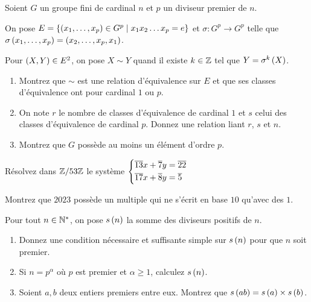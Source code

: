 \begin{exoss}
Soient \(G\) un groupe fini de cardinal \(n\) et \(p\) un diviseur premier de \(n\).

On pose \(E=\left\lbrace\left(x_1,\dots,x_p\right)\in G^p\;\middle|\; x_1x_2\dots x_p=e\right\rbrace\) et \(\sigma:G^p\to G^p\) telle que \(\sigma\left(x_1,\dots,x_p\right)=\left(x_2,\dots,x_p,x_1\right)\).

Pour \(\left(X,Y\right)\in E^2\), on pose \(X\sim Y\) quand il existe \(k\in\mathbb{Z}\) tel que \(Y=\sigma^k\left(X\right)\).

\begin{enumerate}
    \item Montrez que \(\sim\) est une relation d'équivalence sur \(E\) et que ses classes d'équivalence ont pour cardinal \(1\) ou \(p\). \\
    \item On note \(r\) le nombre de classes d'équivalence de cardinal \(1\) et \(s\) celui des classes d'équivalence de cardinal \(p\). Donnez une relation liant \(r\), \(s\) et \(n\). \\
    \item Montrez que \(G\) possède au moins un élément d'ordre \(p\).
\end{enumerate}
\end{exoss}

\begin{exos}
Résolvez dans \(\mathbb{Z}/53\mathbb{Z}\) le système \(\begin{dcases}
\overline{13}x+\overline{7}y=\overline{22} \\
\overline{17}x+\overline{8}y=\overline{5}
\end{dcases}\)
\end{exos}

\begin{exoss}
Montrez que \(2023\) possède un multiple qui ne s'écrit en base \(10\) qu'avec des \(1\).
\end{exoss}

\begin{exoss}
Pour tout \(n\in\mathbb{N}^*\), on pose \(s\left(n\right)\) la somme des diviseurs positifs de \(n\).

\begin{enumerate}
    \item Donnez une condition nécessaire et suffisante simple sur \(s\left(n\right)\) pour que \(n\) soit premier. \\
    \item Si \(n=p^\alpha\) où \(p\) est premier et \(\alpha\geq1\), calculez \(s\left(n\right)\). \\
    \item Soient \(a,b\) deux entiers premiers entre eux. Montrez que \(s\left(ab\right)=s\left(a\right)\times s\left(b\right)\).
\end{enumerate}
\end{exoss}

